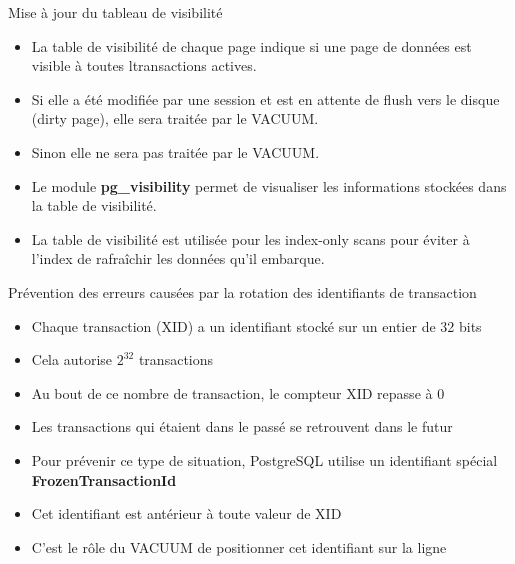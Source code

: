 \begin{frame}{Mise à jour du tableau de visibilité}

\begin{itemize}
   \item La table de visibilité de chaque page indique si une page de données est visible à toutes ltransactions actives.
   \item Si elle a été modifiée par une session et est en attente de flush vers le disque (dirty page), elle sera traitée par le VACUUM.
   \item Sinon elle ne sera pas traitée par le VACUUM.
   \item Le module \textbf{pg\_visibility} permet de visualiser les informations stockées dans la table de visibilité.
   \item La table de visibilité est utilisée pour les index-only scans pour éviter à l'index de rafraîchir les données qu'il embarque.
\end{itemize}

\begin{toile}
\end{toile}
   
\end{frame}


\begin{frame}{Prévention des erreurs causées par la rotation des identifiants de transaction}

\begin{itemize}
   \item Chaque transaction (XID) a un identifiant stocké sur un entier de 32 bits
   \item Cela autorise $2^{32}$ transactions
   \item Au bout de ce nombre de transaction, le compteur XID repasse à 0
   \item Les transactions qui étaient dans le passé se retrouvent dans le futur
   \item Pour prévenir ce type de situation, PostgreSQL utilise un identifiant spécial \textbf{FrozenTransactionId}
   \item Cet identifiant est antérieur à toute valeur de XID
   \item C'est le rôle du VACUUM de positionner cet identifiant sur la ligne
\end{itemize}

\end{frame}

